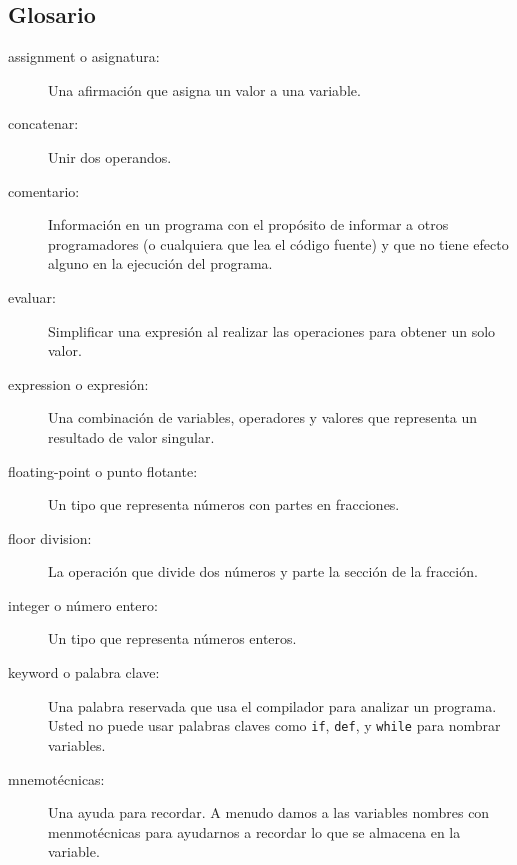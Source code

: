 \begin{ex}


\section{Glosario}

\begin{description}

\item[assignment o asignatura:]  Una afirmaci\'on que asigna un valor a una variable.




\item[concatenar:]  Unir dos operandos.


\item[comentario:]  Informaci\'on en un programa con el prop\'osito de informar a otros programadores (o cualquiera que lea el c\'odigo fuente) y que no tiene efecto alguno en la ejecuci\'on del programa.

\item[evaluar:]  Simplificar una expresi\'on al realizar las operaciones para obtener un solo valor.

\item[expression o expresi\'on:]  Una combinaci\'on de variables, operadores y valores que
representa un resultado de valor singular.

\item[floating-point o punto flotante:] Un tipo que representa n\'umeros con partes en fracciones.

\item[floor division:] La operaci\'on que divide dos n\'umeros y parte la secci\'on de la fracci\'on.

\item[integer o n\'umero entero:] Un tipo que representa n\'umeros enteros.

\item[keyword o palabra clave:]  Una palabra reservada que usa el compilador para analizar un programa. Usted no puede usar palabras claves como {\tt if}, {\tt  def}, y {\tt while} para nombrar
variables.

\item[mnemot\'ecnicas:] Una ayuda para recordar. A menudo damos a las variables nombres con menmot\'ecnicas para ayudarnos a recordar lo que se almacena en la variable.


\end{description}
\end{ex}
